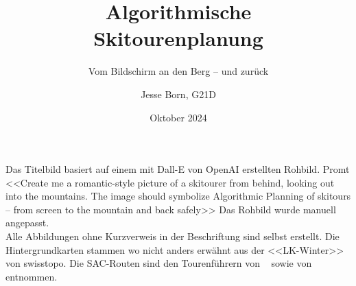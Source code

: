 \documentclass[a4paper, listof=numbered, numbers=noenddot]{scrarticle}
\title{\AKAfont\Huge\textcolor{AKSAcolor}{Algorithmische\\Skitourenplanung}}
\subtitle{Vom Bildschirm an den Berg -- und zurück}
\author{Jesse Born, G21D}
\date{Oktober 2024}
\begin{document}

\maketitle
\tableofcontents

% 






\clearpage


\printbibliography[heading=bibnumbered]
\clearpage

\appendix
{}
\glsaddallunused
\printglossary[type=\acronymtype, style=long, title={Abkürzungsverzeichnis}, nonumberlist]
\clearpage
\listoffigures


Das Titelbild basiert auf einem mit Dall-E von OpenAI erstellten Rohbild. Promt <<Create me a romantic-style picture of a skitourer from behind, looking out into the mountains. The image should symbolize Algorithmic Planning of skitours -- from screen to the mountain and back safely>> Das Rohbild wurde manuell angepasst.\\

Alle Abbildungen ohne Kurzverweis in der Beschriftung sind selbst erstellt. Die Hintergrundkarten stammen wo nicht anders erwähnt aus der <<LK-Winter>> von swisstopo. Die SAC-Routen sind den Tourenführern  von \citeauthor{mmzentralch}~\cite{mmzentralch} sowie  von \citeauthor{twslstgallappzll}~\cite{twslstgallappzll} entnommen.
\clearpage

\end{document}
